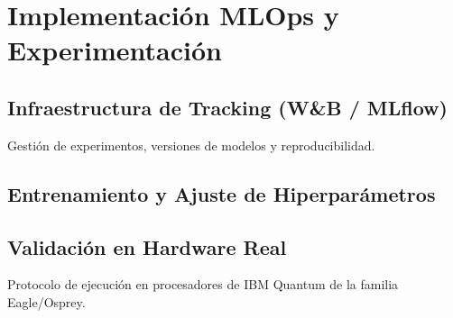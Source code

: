 \chapter{Implementación MLOps y Experimentación}
\label{cap:mlops}

\section{Infraestructura de Tracking (W\&B / MLflow)}
Gestión de experimentos, versiones de modelos y reproducibilidad.

\section{Entrenamiento y Ajuste de Hiperparámetros}

\section{Validación en Hardware Real}
Protocolo de ejecución en procesadores de IBM Quantum de la familia Eagle/Osprey.